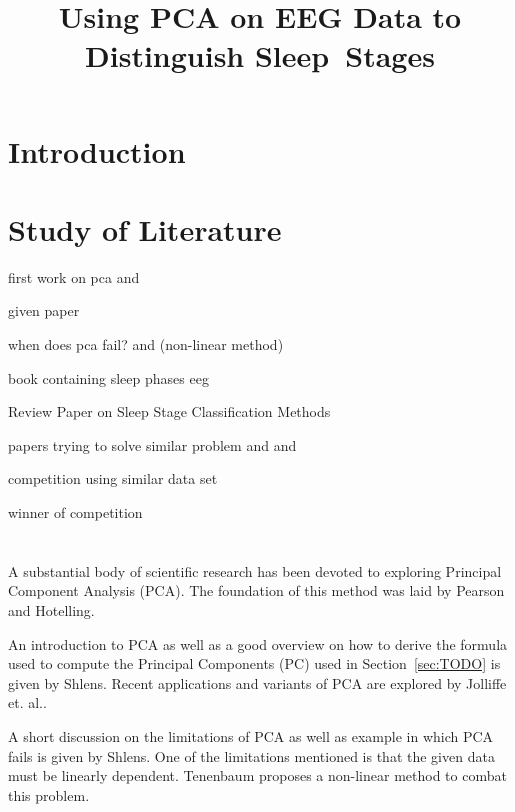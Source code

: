 \documentclass[a4paper]{IEEEtran}
\title{Using PCA on EEG Data to Distinguish Sleep~Stages}
\author{\IEEEauthorblockN{Ida Hönigmann}
	\IEEEauthorblockA{\\Technical University Vienna, Austria\\
		Email: e12002348@student.tuwien.ac.at}}
\begin{document}
\maketitle

\begin{abstract}

\end{abstract}

\section{Introduction}

\section{Study of Literature}
\label{sec:study_of_literature}

first work on pca \cite{Pearson1901} and \cite{Hotelling1933}

given paper \cite{Jolliffe2016}

when does pca fail? \cite{Shlens2014} and \cite{Tenenbaum2000} (non-linear method)

book containing sleep phases eeg \cite{Ganong1997}

Review Paper on Sleep Stage Classification Methods \cite{Boostani2017}

papers trying to solve similar problem \cite{Tautan2021} and \cite{Putilov2015} and \cite{Metzner2023}

competition using similar data set \cite{Ghassemi2018}

winner of competition \cite{Howe2018}
\\
\\
\\
A substantial body of scientific research has been devoted to exploring Principal Component Analysis (PCA).
The foundation of this method was laid by Pearson\cite{Pearson1901} and Hotelling\cite{Hotelling1933}.

An introduction to PCA as well as a good overview on how to derive the formula used to compute the Principal Components (PC) used in Section~\ref{sec:TODO} is given by Shlens\cite{Shlens2014}.
Recent applications and variants of PCA are explored by Jolliffe et. al.\cite{Jolliffe2016}.

A short discussion on the limitations of PCA as well as example in which PCA fails is given by Shlens\cite{Shlens2014}.
One of the limitations mentioned is that the given data must be linearly dependent.
Tenenbaum proposes a non-linear method to combat this problem\cite{Tenenbaum2000}.
\end{document}
